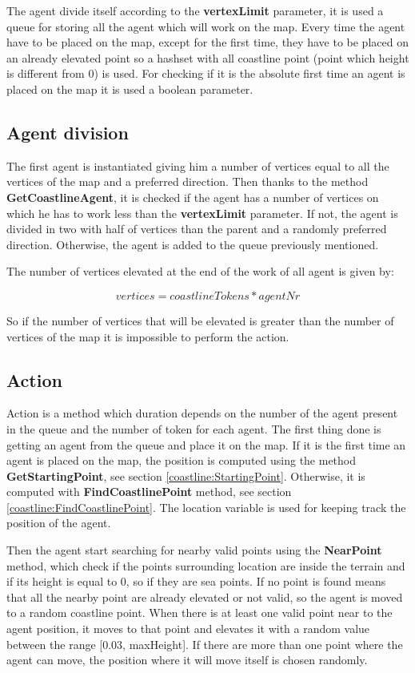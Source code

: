 \documentclass[12pt]{article}
\begin{document}
    The agent divide itself according to the \textbf{vertexLimit} parameter, it is used a queue for storing all the agent which will work on the map. 
    Every time the agent have to be placed on the map, except for the first time, they have to be placed on an already elevated point so a hashset with all coastline point
    (point which height is different from 0) is used. For checking if it is the absolute first time an agent is placed on the map it is used a boolean parameter. 

    \subsection{Agent division}
    The first agent is instantiated giving him a number of vertices equal to all the vertices of the map and a preferred direction. Then thanks to the method \textbf{GetCoastlineAgent},
    it is checked if the agent has a number of vertices on which he has to work less than the \textbf{vertexLimit} parameter. If not, the agent is divided in two with half
    of vertices than the parent and a randomly preferred direction. Otherwise, the agent is added to the queue previously mentioned.  

    The number of vertices elevated at the end of the work of all agent is given by:

    \begin{equation}
        vertices = coastlineTokens * agentNr
    \end{equation}

    \noindent
    So if the number of vertices that will be elevated is greater than the number of vertices of the map it is impossible to perform the action.

    \subsection{Action}
    Action is a method which duration depends on the number of the agent present in the queue and the number of token for each agent. The first thing done is getting an agent
    from the queue and place it on the map. If it is the first time an agent is placed on the map, the position is computed using the method \textbf{GetStartingPoint}, see 
    section \ref{coastline:StartingPoint}. Otherwise, it is computed with \textbf{FindCoastlinePoint} method, see section \ref{coastline:FindCoastlinePoint}. The location variable is used for keeping
    track the position of the agent.

    Then the agent start searching for nearby valid points using the \textbf{NearPoint} method, which check if the points surrounding location are inside the terrain and if its
    height is equal to 0, so if they are sea points. If no point is found means that all the nearby point are already elevated or not valid,
    so the agent is moved to a random coastline point. When there is at least one valid point near to the agent position, it moves to that point and elevates it with a random
    value between the range [0.03, maxHeight]. If there are more than one point where the agent can move, the position where it will move itself is chosen randomly.
\end{document}

